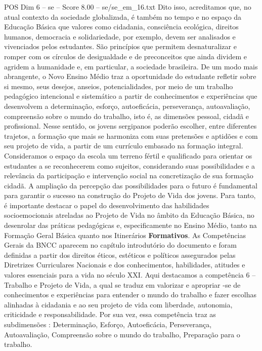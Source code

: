 \begin{textsample}{POS Dim 6 – se – Score 8.00 – se/se\_em\_16.txt}
Dito isso, acreditamos que, no atual contexto da sociedade globalizada, é também no tempo e no espaço da Educação Básica que valores como cidadania, consciência ecológica, direitos humanos, democracia e solidariedade, por exemplo, devem ser analisados e vivenciados pelos estudantes.
São princípios que permitem desnaturalizar e romper com os círculos de desigualdade e de preconceitos que ainda dividem e agridem a humanidade e, em particular, a sociedade brasileira.
De um modo mais abrangente, o Novo Ensino Médio traz a oportunidade do estudante refletir sobre si mesmo, seus desejos, anseios, potencialidades, por meio de um trabalho pedagógico intencional e sistemático a partir de conhecimentos e experiências que desenvolvem a determinação, esforço, autoeficácia, perseverança, autoavaliação, compreensão sobre o mundo do trabalho, isto é, as dimensões pessoal, cidadã e profissional.
Nesse sentido, os jovens sergipanos poderão escolher, entre diferentes trajetos, a formação que mais se harmoniza com suas pretensões e aptidões e com seu projeto de vida, a partir de um currículo embasado na formação integral.
Consideramos o espaço da escola um terreno fértil e qualificado para orientar os estudantes a se reconhecerem como sujeitos, considerando suas possibilidades e a relevância da participação e intervenção social na concretização de sua formação cidadã.
A ampliação da percepção das possibilidades para o futuro é fundamental para garantir o sucesso na construção do Projeto de Vida dos jovens.
Para tanto, é importante destacar o papel do desenvolvimento das habilidades socioemocionais atreladas ao Projeto de Vida no âmbito da Educação Básica, no desenrolar das práticas pedagógicas e, especificamente no Ensino Médio, tanto na Formação Geral Básica quanto nos Itinerários \textbf{Formativos}.
As Competências Gerais da BNCC aparecem no capítulo introdutório do documento e foram definidas a partir dos direitos éticos, estéticos e políticos assegurados pelas Diretrizes Curriculares Nacionais e dos conhecimentos, habilidades, atitudes e valores essenciais para a vida no século XXI.
Aqui destacamos a competência 6 – Trabalho e Projeto de Vida, a qual se traduz em valorizar e apropriar -se de conhecimentos e experiências para entender o mundo do trabalho e fazer escolhas alinhadas à cidadania e ao seu projeto de vida com liberdade, autonomia, criticidade e responsabilidade.
Por sua vez, essa competência traz as subdimensões : Determinação, Esforço, Autoeficácia, Perseverança, Autoavaliação, Compreensão sobre o mundo do trabalho, Preparação para o trabalho.

\end{textsample}

